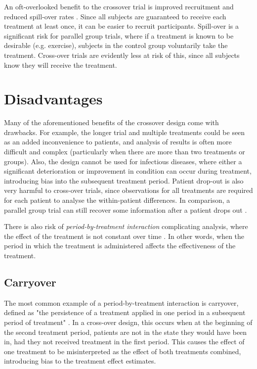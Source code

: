 \documentclass[12pt, TexShade, letterpaper]{report}
\begin{document}
An oft-overlooked benefit to the crossover trial is improved recruitment and reduced spill-over rates \cite{piantadosi2005clinical}. Since all subjects are guaranteed to receive each treatment at least once, it can be easier to recruit participants. Spill-over is a significant risk for parallel group trials, where if a treatment is known to be desirable (e.g. exercise), subjects in the control group voluntarily take the treatment. Cross-over trials are evidently less at risk of this, since all subjects know they will receive the treatment.

\section{Disadvantages}
Many of the aforementioned benefits of the crossover design come with drawbacks. For example, the longer trial and multiple treatments could be seen as an added inconvenience to patients, and analysis of results is often more difficult and complex (particularly when there are more than two treatments or groups). Also, the design cannot be used for infectious diseases, where either a significant deterioration or improvement in condition can occur during treatment, introducing bias into the subsequent treatment period. Patient drop-out is also very harmful to cross-over trials, since observations for all treatments are required for each patient to analyse the within-patient differences. In comparison, a parallel group trial can still recover some information after a patient drops out \cite{senn2002crossover}.

There is also risk of \textit{period-by-treatment interaction} complicating analysis, where the effect of the treatment is not constant over time \cite{senn2002crossover}. In other words, when the period in which the treatment is administered affects the effectiveness of the treatment.

\subsection{Carryover}
The most common example of a period-by-treatment interaction is carryover, defined as "the persistence of a treatment applied in one period in a subsequent period of treatment" \cite{senn2002crossover}. In a cross-over design, this occurs when at the beginning of the second treatment period, patients are not in the state they would have been in, had they not received treatment in the first period. This causes the effect of one treatment to be misinterpreted as the effect of both treatments combined, introducing bias to the treatment effect estimates.
\end{document}
